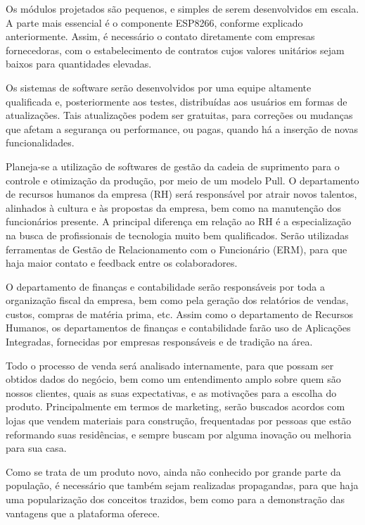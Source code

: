 Os módulos projetados são pequenos, e simples de serem desenvolvidos em escala. A parte mais essencial é o componente ESP8266, conforme explicado anteriormente. Assim, é necessário o contato diretamente com empresas fornecedoras, com o estabelecimento de contratos cujos valores unitários sejam baixos para quantidades elevadas.

Os sistemas de software serão desenvolvidos por uma equipe altamente qualificada e, posteriormente aos testes, distribuídas aos usuários em formas de atualizações. Tais atualizações podem ser gratuitas, para correções ou mudanças que afetam a segurança ou performance, ou pagas, quando há a inserção de novas funcionalidades.

Planeja-se a utilização de softwares de gestão da cadeia de suprimento para o controle e otimização da produção, por meio de um modelo Pull.
O departamento de recursos humanos da empresa (RH) será responsável por atrair novos talentos, alinhados à cultura e às propostas da empresa, bem como na manutenção dos funcionários presente. A principal diferença em relação ao RH é a especialização na busca de profissionais de tecnologia muito bem qualificados. Serão utilizadas ferramentas de Gestão de Relacionamento com o Funcionário (ERM), para que haja maior contato e feedback entre os colaboradores.

O departamento de finanças e contabilidade serão responsáveis por toda a organização fiscal da empresa, bem como pela geração dos relatórios de vendas, custos, compras de matéria prima, etc. Assim como o departamento de Recursos Humanos, os departamentos de finanças e contabilidade farão uso de Aplicações Integradas, fornecidas por empresas responsáveis e de tradição na área.

Todo o processo de venda será analisado internamente, para que possam ser obtidos dados do negócio, bem como um entendimento amplo sobre quem são nossos clientes, quais as suas expectativas, e as motivações para a escolha do produto. Principalmente em termos de marketing, serão buscados acordos com lojas que vendem materiais para construção, frequentadas por pessoas que estão reformando suas residências, e sempre buscam por alguma inovação ou melhoria para sua casa.

Como se trata de um produto novo, ainda não conhecido por grande parte da população, é necessário que também sejam realizadas propagandas, para que haja uma popularização dos conceitos trazidos, bem como para a demonstração das vantagens que a plataforma oferece.

